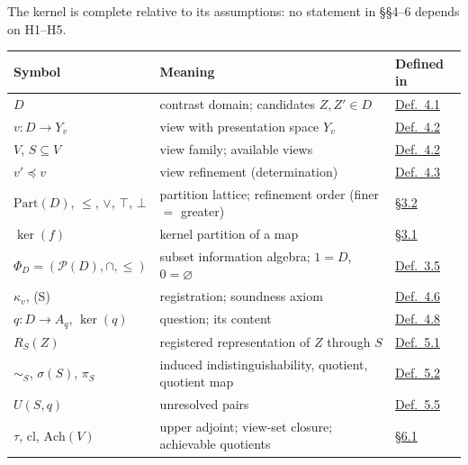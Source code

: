 The kernel is complete relative to its assumptions: no statement in §§4--6 depends on H1--H5.


{\def\LTcaptype{none} %
\begin{longtable}[]{@{}
  >{\raggedright\arraybackslash}p{}
  >{\raggedright\arraybackslash}p{}
  >{\raggedright\arraybackslash}p{}@{}}
\toprule\noalign{}
\begin{minipage}[b]{\linewidth}\raggedright
Symbol
\end{minipage} & \begin{minipage}[b]{\linewidth}\raggedright
Meaning
\end{minipage} & \begin{minipage}[b]{\linewidth}\raggedright
Defined in
\end{minipage} \\
\midrule\noalign{}
\endhead
\bottomrule\noalign{}
\endlastfoot
\(D\) & contrast domain; candidates \(Z, Z' \in D\) & \hyperlink{stmt:4.1}{Def.~4.1} \\
\(v : D \to Y_v\) & view with presentation space \(Y_v\) & \hyperlink{stmt:4.2}{Def.~4.2} \\
\(V\), \(S \subseteq V\) & view family; available views & \hyperlink{stmt:4.2}{Def.~4.2} \\
\(v' \preceq v\) & view refinement (determination) & \hyperlink{stmt:4.3}{Def.~4.3} \\
\(\mathrm{Part}(D)\), \(\le\), \(\vee\), \(\top\), \(\bot\) & partition lattice; refinement order (finer \(=\) greater) & \hyperlink{sec:3.2}{§3.2} \\
\(\ker(f)\) & kernel partition of a map & \hyperlink{sec:3.1}{§3.1} \\
\(\Phi_D = (\mathcal{P}(D), \cap, \le)\) & subset information algebra; \(1 = D\), \(0 = \varnothing\) & \hyperlink{stmt:3.5}{Def.~3.5} \\
\(\kappa_v\), (S) & registration; soundness axiom & \hyperlink{stmt:4.6}{Def.~4.6} \\
\(q : D \to A_q\), \(\ker(q)\) & question; its content & \hyperlink{stmt:4.8}{Def.~4.8} \\
\(R_S(Z)\) & registered representation of \(Z\) through \(S\) & \hyperlink{stmt:5.1}{Def.~5.1} \\
\(\sim_S\), \(\sigma(S)\), \(\pi_S\) & induced indistinguishability, quotient, quotient map & \hyperlink{stmt:5.2}{Def.~5.2} \\
\(U(S, q)\) & unresolved pairs & \hyperlink{stmt:5.5}{Def.~5.5} \\
\(\tau\), \(\mathrm{cl}\), \(\mathrm{Ach}(V)\) & upper adjoint; view-set closure; achievable quotients & \hyperlink{sec:6.1}{§6.1} \\
\end{longtable}
}
